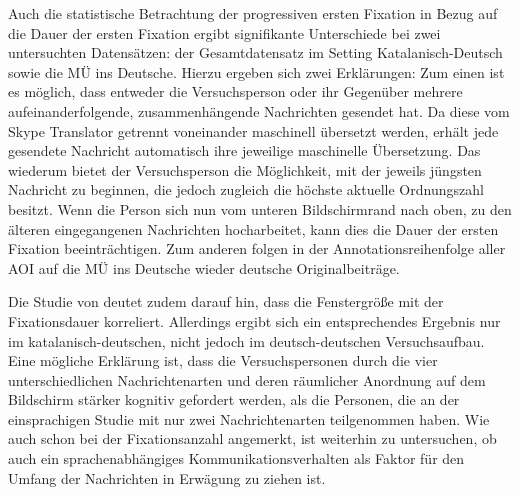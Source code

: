 Auch die statistische Betrachtung der progressiven ersten Fixation in Bezug auf die Dauer der ersten Fixation ergibt signifikante Unterschiede bei zwei untersuchten Datensätzen: der Gesamtdatensatz im Setting Katalanisch-Deutsch sowie die MÜ ins Deutsche. Hierzu ergeben sich zwei Erklärungen: Zum einen ist es möglich, dass entweder die Versuchsperson oder ihr Gegenüber mehrere aufeinanderfolgende, zusammenhängende Nachrichten gesendet hat. Da diese vom Skype Translator getrennt voneinander maschinell übersetzt werden, erhält jede gesendete Nachricht automatisch ihre jeweilige maschinelle Übersetzung. Das wiederum bietet der Versuchsperson die Möglichkeit, mit der jeweils jüngsten Nachricht zu beginnen, die jedoch zugleich die höchste aktuelle Ordnungszahl besitzt. Wenn die Person sich nun vom unteren Bildschirmrand nach oben, zu den älteren eingegangenen Nachrichten hocharbeitet, kann dies die Dauer der ersten Fixation beeinträchtigen. Zum anderen folgen in der Annotationsreihenfolge aller AOI auf die MÜ ins Deutsche wieder deutsche Originalbeiträge.

Die Studie von \citet[433]{inhoff_parafoveal_1986} deutet zudem darauf hin, dass die Fenstergröße mit der Fixationsdauer korreliert. Allerdings ergibt sich ein entsprechendes Ergebnis nur im katalanisch-deutschen, nicht jedoch im deutsch-deutschen Versuchsaufbau. Eine mögliche Erklärung ist, dass die Versuchspersonen durch die vier unterschiedlichen Nachrichtenarten und deren räumlicher Anordnung auf dem Bildschirm stärker kognitiv gefordert werden, als die Personen, die an der einsprachigen Studie mit nur zwei Nachrichtenarten teilgenommen haben. Wie auch schon bei der Fixationsanzahl angemerkt, ist weiterhin zu untersuchen, ob auch ein sprachenabhängiges Kommunikationsverhalten als Faktor für den Umfang der Nachrichten in Erwägung zu ziehen ist. 



